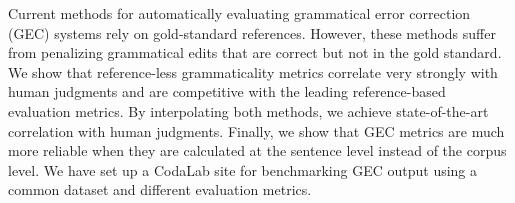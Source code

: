 Current methods for automatically evaluating grammatical error correction (GEC) systems rely on gold-standard references. However, these methods suffer from penalizing grammatical edits that are correct but not in the gold standard. We show that reference-less grammaticality metrics correlate very strongly with human judgments and are competitive with the leading reference-based evaluation metrics. By interpolating both methods, we achieve state-of-the-art correlation with human judgments. Finally, we show that GEC metrics are much more reliable when they are calculated at the sentence level instead of the corpus level. We have set up a CodaLab site for benchmarking GEC output using a common dataset and different evaluation metrics.
